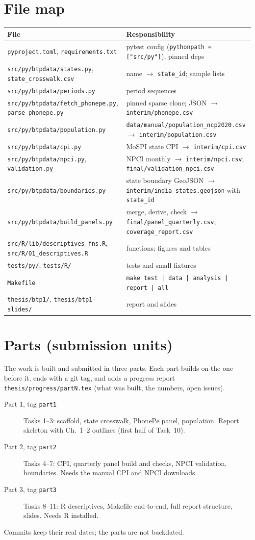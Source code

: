 \documentclass[10pt,a4paper]{article}
\newcommand{\f}[1]{\texttt{#1}}
\begin{document}
\section*{File map}
\begin{tabularx}{\textwidth}{@{}l Y@{}}
\toprule
File & Responsibility \\
\midrule
\f{pyproject.toml}, \f{requirements.txt} & pytest config (\f{pythonpath = ["src/py"]}), pinned deps \\
\f{src/py/btpdata/states.py}, \f{state\_crosswalk.csv} & name $\to$ \f{state\_id}; sample lists \\
\f{src/py/btpdata/periods.py} & period sequences \\
\f{src/py/btpdata/fetch\_phonepe.py}, \f{parse\_phonepe.py} & pinned sparse clone; JSON $\to$ \f{interim/phonepe.csv} \\
\f{src/py/btpdata/population.py} & \f{data/manual/population\_ncp2020.csv} $\to$ \f{interim/population.csv} \\
\f{src/py/btpdata/cpi.py} & MoSPI state CPI $\to$ \f{interim/cpi.csv} \\
\f{src/py/btpdata/npci.py}, \f{validation.py} & NPCI monthly $\to$ \f{interim/npci.csv}; \f{final/validation\_npci.csv} \\
\f{src/py/btpdata/boundaries.py} & state boundary GeoJSON $\to$ \f{interim/india\_states.geojson} with \f{state\_id} \\
\f{src/py/btpdata/build\_panels.py} & merge, derive, check $\to$ \f{final/panel\_quarterly.csv}, \f{coverage\_report.csv} \\
\f{src/R/lib/descriptives\_fns.R}, \f{src/R/01\_descriptives.R} & functions; figures and tables \\
\f{tests/py/}, \f{tests/R/} & tests and small fixtures \\
\f{Makefile} & \f{make test | data | analysis | report | all} \\
\f{thesis/btp1/}, \f{thesis/btp1-slides/} & report and slides \\
\bottomrule
\end{tabularx}

\section*{Parts (submission units)}
The work is built and submitted in three parts. Each part builds on the one before it, ends with a git tag,
and adds a progress report \f{thesis/progress/partN.tex} (what was built, the numbers, open issues).
\begin{description}
\item[Part 1, tag \f{part1}] Tasks 1--3: scaffold, state crosswalk, PhonePe panel, population.
      Report skeleton with Ch.~1--2 outlines (first half of Task~10).
\item[Part 2, tag \f{part2}] Tasks 4--7: CPI, quarterly panel build and checks, NPCI validation, boundaries.
      Needs the manual CPI and NPCI downloads.
\item[Part 3, tag \f{part3}] Tasks 8--11: R descriptives, Makefile end-to-end, full report structure, slides.
      Needs R installed.
\end{description}
Commits keep their real dates; the parts are not backdated.
\end{document}
